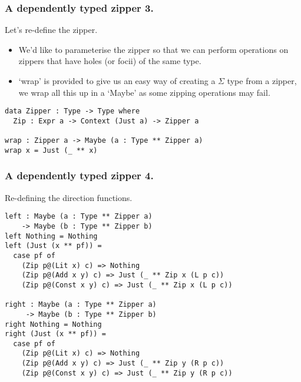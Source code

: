 \documentclass{beamer}
\begin{document}
\begin{frame}[fragile]
  \frametitle{A dependently typed zipper 3.}
  \begin{block}{Let's re-define the zipper.}
    \begin{itemize}
      \item We'd like to parameterise the zipper so that we can
        perform operations on zippers that have holes (or focii) of
        the same type.
      \item `wrap' is provided to give us an easy way of creating a
        $\Sigma$ type from a zipper, we wrap all this up in a `Maybe'
        as some zipping operations may fail.
    \end{itemize}
  \begin{verbatim}
data Zipper : Type -> Type where
  Zip : Expr a -> Context (Just a) -> Zipper a

wrap : Zipper a -> Maybe (a : Type ** Zipper a)
wrap x = Just (_ ** x)
  \end{verbatim}
  \end{block}
\end{frame}

\begin{frame}[fragile]
  \frametitle{A dependently typed zipper 4.}
  \begin{block}{Re-defining the direction functions.}
    \begin{verbatim}
left : Maybe (a : Type ** Zipper a) 
    -> Maybe (b : Type ** Zipper b)
left Nothing = Nothing
left (Just (x ** pf)) = 
  case pf of
    (Zip p@(Lit x) c) => Nothing
    (Zip p@(Add x y) c) => Just (_ ** Zip x (L p c)) 
    (Zip p@(Const x y) c) => Just (_ ** Zip x (L p c)) 

right : Maybe (a : Type ** Zipper a) 
     -> Maybe (b : Type ** Zipper b)
right Nothing = Nothing
right (Just (x ** pf)) = 
  case pf of
    (Zip p@(Lit x) c) => Nothing 
    (Zip p@(Add x y) c) => Just (_ ** Zip y (R p c)) 
    (Zip p@(Const x y) c) => Just (_ ** Zip y (R p c)) 
     \end{verbatim}
  \end{block}
\end{frame}
\end{document}
